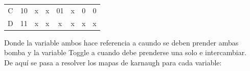 \begin{table}[H]
\begin{tabular}{|cc|cccc|cc|}
\multicolumn{1}{|c|}{C} & 10                    & x                                                         & x                                                         & 01                                                                             & x                                                         & 0                & 0                 \\ \cline{1-1}
\multicolumn{1}{|c|}{D} & 11                    & x                                                         & x                                                         & x                                                                              & x                                                         & x                & x                 \\ \hline
\end{tabular}
\end{table}
Donde la variable ambos hace referencia a caundo se deben prender ambas bomba y la variable Toggle a cuando debe prenderse una solo e intercambiar.\\
De aquí se pasa a resolver los mapas de karnaugh para cada variable:
   \begin{Karnaugh}
        

        
    \end{Karnaugh}



